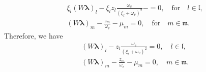 \documentclass[12pt]{amsart}
\theoremstyle{definition}
\begin{document}
\begin{equation}\label{conds-1}
\begin{aligned}
    &\xi_l(W\bm{\lambda})_l-\xi_l z_{l}\frac{\omega_v}{(\xi_l+\omega_v)^2}-=0, \quad\mbox{for}\quad l \in \mathfrak{l},\\
    &(W\bm{\lambda})_m-\frac{z_{m}}{\omega_v}-\mu_m=0,\quad\mbox{for}\quad m\in\mathfrak{m}.
\end{aligned}
\end{equation}
Therefore, we have
\begin{equation}\label{conds-1}
\begin{aligned}
    &(W\bm{\lambda})_l-z_{l}\frac{\omega_v}{(\xi_l+\omega_v)^2}=0, \quad l\in \mathfrak{l},\\
    &(W\bm{\lambda})_m-\frac{z_m}{\omega_v}-\mu_m=0, \quad m\in \mathfrak{m}.
\end{aligned}
\end{equation}



\end{document}
